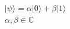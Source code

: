 \documentclass[preview]{standalone}
\begin{document}
\begin{align*}
&| \psi \rangle = \alpha | 0 \rangle + \beta | 1 \rangle \\ & \alpha, \beta \in \mathbb{C}
\end{align*}
\end{document}
